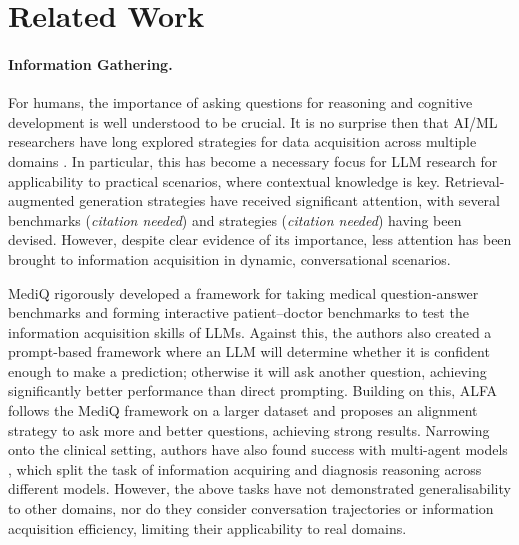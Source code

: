 \documentclass{article} %
\begin{document}
\section{Related Work}

\paragraph{Information Gathering.}
For humans, the importance of asking questions for reasoning \cite{Neirotti2021-xb} and cognitive development \cite{Chouinard2007-xg} is well understood to be crucial. It is no surprise then that AI/ML researchers have long explored strategies for data acquisition across multiple domains \cite{questbench}. In particular, this has become a necessary focus for LLM research for applicability to practical scenarios, where contextual knowledge is key. Retrieval-augmented generation strategies have received significant attention, with several benchmarks (\textit{citation needed}) and strategies (\textit{citation needed}) having been devised. However, despite clear evidence \cite{wu2024largelanguagemodelsask} of its importance, less attention has been brought to information acquisition in dynamic, conversational scenarios.

MediQ \cite{mediq} rigorously developed a framework for taking medical question-answer benchmarks and forming interactive patient--doctor benchmarks to test the information acquisition skills of LLMs. Against this, the authors also created a prompt-based framework where an LLM will determine whether it is confident enough to make a prediction; otherwise it will ask another question, achieving significantly better performance than direct prompting. Building on this, ALFA \cite{alfa} follows the MediQ framework on a larger dataset and proposes an alignment strategy to ask more and better questions, achieving strong results. Narrowing onto the clinical setting, authors have also found success with multi-agent models \cite{curious,ddo}, which split the task of information acquiring and diagnosis reasoning across different models. However, the above tasks have not demonstrated generalisability to other domains, nor do they consider conversation trajectories or information acquisition efficiency, limiting their applicability to real domains.
\end{document}
